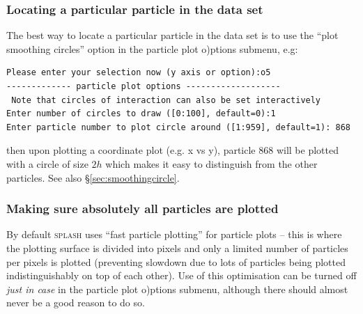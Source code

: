 \documentclass[a4paper,10pt]{article}
\newcommand{\splash}{\textsc{splash }}
\begin{document}
\subsubsection{ Locating a particular particle in the data set}
\label{sec:findingaparticle}
 The best way to locate a particular particle in the data set is to use the ``plot smoothing circles'' option in the particle plot o)ptions submenu, e.g:
\begin{verbatim}
Please enter your selection now (y axis or option):o5
------------- particle plot options -------------------
 Note that circles of interaction can also be set interactively
Enter number of circles to draw ([0:100], default=0):1
Enter particle number to plot circle around ([1:959], default=1): 868
\end{verbatim}
 then upon plotting a coordinate plot (e.g. x vs y), particle 868 will be plotted with a circle of size $2h$ which makes it easy to distinguish from the other particles. See also \S\ref{sec:smoothingcircle}.

\subsubsection{ Making sure absolutely all particles are plotted}
 By default \splash uses ``fast particle plotting'' for particle plots -- this is where the plotting surface is divided into pixels and only a limited number of particles per pixels is plotted (preventing slowdown due to lots of particles being plotted indistinguishably on top of each other). Use of this optimisation can be turned off \emph{just in case} in the particle plot o)ptions submenu, although there should almost never be a good reason to do so.
\end{document}
